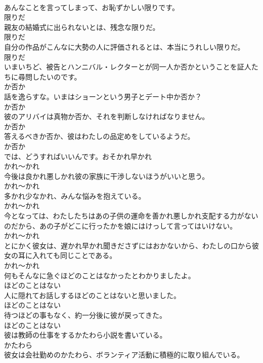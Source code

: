 \documentclass[8pt]{extreport}
\begin{document}
\begin{CJK}{UTF8}{min}
\\	あんなことを言ってしまって、お恥ずかしい限りです。	
\\	限りだ
\\	親友の結婚式に出られないとは、残念な限りだ。	
\\	限りだ
\\	自分の作品がこんなに大勢の人に評価されるとは、本当にうれしい限りだ。	
\\	限りだ
\\	いまいちど、被告とハンニバル・レクターとが同一人か否かということを証人たちに尋問したいのです。	
\\	か否か
\\	話を逸らすな。いまはショーンという男子とデート中か否か？	
\\	か否か
\\	彼のアリバイは真物か否か、それを判断しなければなりません。	
\\	か否か
\\	答えるべきか否か、彼はわたしの品定めをしているようだ。	
\\	か否か
\\	では、どうすればいいんです。おそかれ早かれ
\\	かれ～かれ
\\	今後は良かれ悪しかれ彼の家族に干渉しないほうがいいと思う。	
\\	かれ～かれ
\\	多かれ少なかれ、みんな悩みを抱えている。	
\\	かれ～かれ
\\	今となっては、わたしたちはあの子供の運命を善かれ悪しかれ支配する力がないのだから、あの子がどこに行ったかを娘にはけっして言ってはいけない。	
\\	かれ～かれ
\\	とにかく彼女は、遅かれ早かれ聞きださずにはおかないから、わたしの口から彼女の耳に入れても同じことである。	
\\	かれ～かれ
\\	何もそんなに急ぐほどのことはなかったとわかりましたよ。	
\\	ほどのことはない
\\	人に隠れてお話しするほどのことはないと思いました。	
\\	ほどのことはない
\\	待つほどの事もなく、約一分後に彼が戻ってきた。	
\\	ほどのことはない
\\	彼は教師の仕事をするかたわら小説を書いている。	
\\	かたわら
\\	彼女は会社勤めのかたわら、ボランティア活動に積極的に取り組んでいる。	

\end{CJK}
\end{document}
